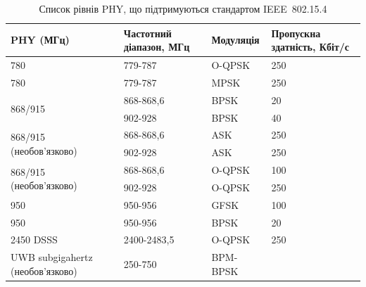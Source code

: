\documentclass[a4paper,ukrainian,utf8,nocolumnsxix,floatsection,equationsection]{eskdtext}
\newcommand{\iee}[0]{IEEE~802.15.4\xspace}
\begin{document}
\begin{table}[htbp]
	\caption{Список рівнів PHY, що підтримуються стандартом \iee}
	\begin{tabular}{|p{}|p{}|p{}|p{}|}
		\hline
		PHY (МГц)                                 & Частотний діапазон, МГц      & Модуляція              & Пропускна здатність, Кбіт/с \\ \hline
		780                                       & 779-787                      & O-QPSK                 & 250                         \\ \hline
		780                                       & 779-787                      & MPSK                   & 250                         \\ \hline
		\multirow{2}{*}{868/915}                  & 868-868,6                    & BPSK                   & 20                          \\ \cline{ 2- 4}
		                                          & 902-928                      & BPSK                   & 40                          \\ \hline
		\multirow{2}{*}{868/915 (необов’язково)}  & 868-868,6                    & ASK                    & 250                         \\ \cline{ 2- 4}
		                                          & 902-928                      & ASK                    & 250                         \\ \hline
		\multirow{2}{*}{868/915 (необов’язково)}  & 868-868,6                    & O-QPSK                 & 100                         \\ \cline{ 2- 4}
		                                          & 902-928                      & O-QPSK                 & 250                         \\ \hline
		950                                       & 950-956                      & GFSK                   & 100                         \\ \hline
		950                                       & 950-956                      & BPSK                   & 20                          \\ \hline
		2450 DSSS                                 & 2400-2483,5                  & O-QPSK                 & 250                         \\ \hline
		UWB subgigahertz (необов’язково)          & 250-750                      & BPM-BPSK               &                             \\ \hline

\end{tabular}
\end{table}
\end{document}
